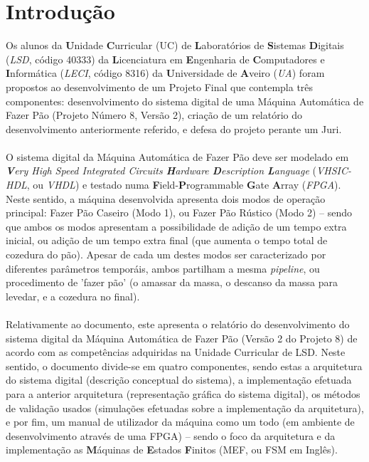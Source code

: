 \documentclass{report}
\begin{document}
\tableofcontents
\listoffigures    %


\clearpage
{}

\chapter{Introdução}
\label{chap.introducao}
Os alunos da \textbf{U}nidade \textbf{C}urricular (UC) de \textbf{L}aboratórios de \textbf{S}istemas \textbf{D}igitais (\textit{LSD}, código 40333) da \textbf{L}icenciatura em \textbf{E}ngenharia de \textbf{C}omputadores e \textbf{I}nformática (\textit{LECI}, código 8316) da \textbf{U}niversidade de \textbf{A}veiro (\textit{UA}) foram propostos ao desenvolvimento de um Projeto Final que contempla três componentes: desenvolvimento do sistema digital de uma Máquina Automática de Fazer Pão (Projeto Número 8, Versão 2), criação de um relatório do desenvolvimento anteriormente referido, e defesa do projeto perante um Juri.
\\\\
O sistema digital da Máquina Automática de Fazer Pão deve ser modelado em \textit{\textbf{V}ery High Speed Integrated Circuits \textbf{H}ardware \textbf{D}escription \textbf{L}anguage} (\textit{VHSIC-HDL}, ou \textit{VHDL}) e testado numa \textbf{F}ield-\textbf{P}rogrammable \textbf{G}ate \textbf{A}rray (\textit{FPGA}). Neste sentido, a máquina desenvolvida apresenta dois modos de operação principal: Fazer Pão Caseiro (Modo 1), ou Fazer Pão Rústico (Modo 2) -- sendo que ambos os modos apresentam a possibilidade de adição de um tempo extra inicial, ou adição de um tempo extra final (que aumenta o tempo total de cozedura do pão). Apesar de cada um destes modos ser caracterizado por diferentes parâmetros temporáis, ambos partilham a mesma \textit{pipeline}, ou procedimento de 'fazer pão'  (o amassar da massa, o descanso da massa para levedar, e a cozedura no final).
\\\\
Relativamente ao documento, este apresenta o relatório do desenvolvimento do sistema digital da Máquina Automática de Fazer Pão (Versão 2 do Projeto 8) de acordo com as competências adquiridas na Unidade Curricular de LSD.
Neste sentido, o documento divide-se em quatro componentes, sendo estas a arquitetura do sistema digital (descrição conceptual do sistema), a implementação efetuada para a anterior arquitetura (representação gráfica do sistema digital), os métodos de validação usados (simulações efetuadas sobre a implementação da arquitetura), e por fim, um manual de utilizador da máquina como um todo (em ambiente de desenvolvimento através de uma FPGA) -- sendo o foco da arquitetura e da implementação as \textbf{M}áquinas de \textbf{E}stados \textbf{F}initos (MEF, ou FSM em Inglês).
\end{document}
